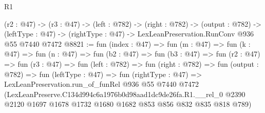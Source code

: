 \begin{lexlean}{R1}
\begin{coremodule}
  (r2 : @47) ->
  (r3 : @47) ->
  (left : @782) ->
  (right : @782) ->
  (output : @782) ->
  (leftType : @47) -> (rightType : @47) -> LexLeanPreservation.RunConv @936 @55 @7440 @7472
@8821 := fun (index : @47) =>
  fun (m : @47) =>
  fun (k : @47) =>
  fun (n : @47) =>
  fun (b2 : @47) =>
  fun (b3 : @47) =>
  fun (r2 : @47) =>
  fun (r3 : @47) =>
  fun (left : @782) =>
  fun (right : @782) =>
  fun (output : @782) =>
  fun (leftType : @47) =>
  fun (rightType : @47) =>
  LexLeanPreservation.run_of_funRel
    @936
    @55
    @7440
    @7472
    (LexLeanPreserve.C134d994c6a1976b0d98aad1dc9de26fa.R1.__rel_0
      @2390
      @2120
      @1697
      @1678
      @1732
      @1680
      @1682
      @853
      @856
      @832
      @835
      @818
      @789)
\end{coremodule}
\end{lexlean}
